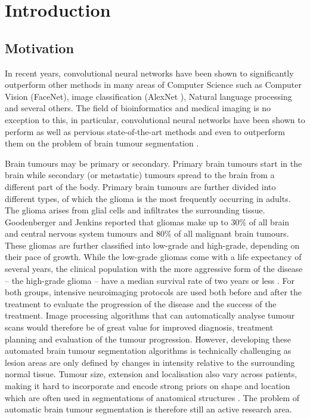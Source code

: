 \documentclass[12pt,a4paper,twoside,openright]{report}
\begin{document}

\pagestyle{headings}

\chapter{Introduction}
\section{Motivation}
In recent years, convolutional neural networks have been shown to significantly outperform other methods in many areas of Computer Science such as Computer Vision (FaceNet\cite{face_net}), image classification (AlexNet \cite{alex_net}), Natural language processing \cite{nlp_deep_learning} and several others. The field of bioinformatics and medical imaging is no exception to this, in particular, convolutional neural networks have been shown to perform as well as pervious state-of-the-art methods and even to outperform them on the problem of brain tumour segmentation \cite{pereira} \cite{kamnitas}.

Brain tumours may be primary or secondary. Primary brain tumours start in the brain while secondary (or metastatic) tumours spread to the brain from a different part of the body. Primary brain tumours are further divided into different types, of which the glioma is the most frequently occurring in adults. The  glioma arises from glial cells and infiltrates the surrounding tissue. Goodenberger and Jenkins \cite{gliomas_research} reported that gliomas make up to 30\% of all brain and central nervous system tumours and 80\% of all malignant brain tumours. These gliomas are further classified into low-grade and high-grade, depending on their pace of growth. While the low-grade gliomas come with a life expectancy of several years, the clinical population with the more aggressive form of the disease -- the high-grade glioma -- have a median survival rate of two years or less \cite{gliomas_life}. For both groups, intensive neuroimaging protocols are used both before and after the treatment to evaluate the progression of the disease and the success of the treatment. Image processing algorithms that can automatically analyse tumour scans would therefore be of great value for improved diagnosis, treatment planning and evaluation of the tumour progression. However, developing these automated brain tumour segmentation algorithms is technically challenging as lesion areas are only defined by changes in intensity relative to the surrounding normal tissue. Tumour size, extension and localisation also vary across patients, making it hard to incorporate and encode strong priors on shape and location which are often used in segmentations of anatomical structures \cite{brats-proceedings}. The problem of automatic brain tumour segmentation is therefore still an active research area. 
\end{document}
